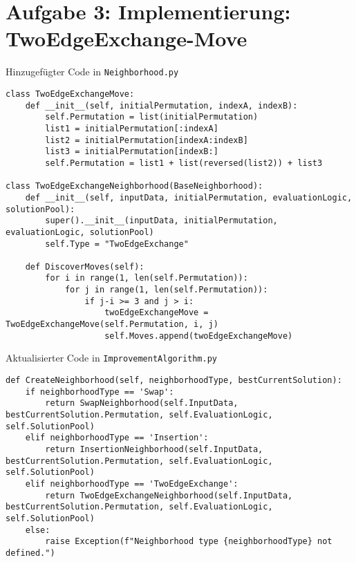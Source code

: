 \documentclass{article}
\begin{document}
	\section*{Aufgabe 3: Implementierung: TwoEdgeExchange-Move}
	Hinzugefügter Code in \texttt{Neighborhood.py}
	\begin{lstlisting}
class TwoEdgeExchangeMove:
	def __init__(self, initialPermutation, indexA, indexB):
		self.Permutation = list(initialPermutation)
		list1 = initialPermutation[:indexA]
		list2 = initialPermutation[indexA:indexB]
		list3 = initialPermutation[indexB:]
		self.Permutation = list1 + list(reversed(list2)) + list3

class TwoEdgeExchangeNeighborhood(BaseNeighborhood):
	def __init__(self, inputData, initialPermutation, evaluationLogic, solutionPool):
		super().__init__(inputData, initialPermutation, evaluationLogic, solutionPool)
		self.Type = "TwoEdgeExchange"

	def DiscoverMoves(self):
		for i in range(1, len(self.Permutation)):
			for j in range(1, len(self.Permutation)):
				if j-i >= 3 and j > i:
					twoEdgeExchangeMove = TwoEdgeExchangeMove(self.Permutation, i, j)
					self.Moves.append(twoEdgeExchangeMove)
	\end{lstlisting}
	Aktualisierter Code in \texttt{ImprovementAlgorithm.py}
	\begin{lstlisting}
def CreateNeighborhood(self, neighborhoodType, bestCurrentSolution):
	if neighborhoodType == 'Swap':
		return SwapNeighborhood(self.InputData, bestCurrentSolution.Permutation, self.EvaluationLogic, self.SolutionPool)
	elif neighborhoodType == 'Insertion':
		return InsertionNeighborhood(self.InputData, bestCurrentSolution.Permutation, self.EvaluationLogic, self.SolutionPool)
	elif neighborhoodType == 'TwoEdgeExchange':
		return TwoEdgeExchangeNeighborhood(self.InputData, bestCurrentSolution.Permutation, self.EvaluationLogic, self.SolutionPool)
	else:
		raise Exception(f"Neighborhood type {neighborhoodType} not defined.")

	\end{lstlisting}
\end{document}
